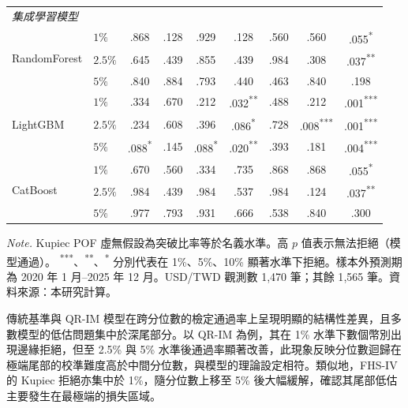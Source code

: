 \begin{table}[htbp]
{\begin{tabular}{llccccccc}
        \cline{2-9}
        \hline
        \multicolumn{9}{l}{\textit{集成學習模型}} \\
        \multirow{3}{*}{RandomForest}  & $1\%$      & .868 & .128 & .929 & .128 & .560 & .560 & .055\textsuperscript{*} \\
                                       & $2.5\%$    & .645 & .439 & .855 & .439 & .984 & .308 & .037\textsuperscript{**} \\
                                       & $5\%$      & .840 & .884 & .793 & .440 & .463 & .840 & .198 \\
        \cline{2-9}
        \multirow{3}{*}{LightGBM}      & $1\%$      & .334 & .670 & .212 & .032\textsuperscript{**} & .488 & .212 & .001\textsuperscript{***} \\
                                       & $2.5\%$    & .234 & .608 & .396 & .086\textsuperscript{*} & .728 & .008\textsuperscript{***} & .001\textsuperscript{***} \\
                                       & $5\%$      & .088\textsuperscript{*} & .145 & .088\textsuperscript{*} & .020\textsuperscript{**} & .393 & .181 & .004\textsuperscript{***} \\
        \cline{2-9}
        \multirow{3}{*}{CatBoost}      & $1\%$      & .670 & .560 & .334 & .735 & .868 & .868 & .055\textsuperscript{*} \\
                                       & $2.5\%$    & .984 & .439 & .984 & .537 & .984 & .124 & .037\textsuperscript{**} \\
                                       & $5\%$      & .977 & .793 & .931 & .666 & .538 & .840 & .300 \\
        \cline{2-9}
        \hline
    \end{tabular}}

    \vspace{3mm}
    \begin{minipage}{\textwidth}
        \fontsize{9pt}{13pt}\selectfont
        \textit{Note.} Kupiec POF 虛無假設為突破比率等於名義水準。高 $p$ 值表示無法拒絕（模型通過）。
        \textsuperscript{***}、\textsuperscript{**}、\textsuperscript{*} 分別代表在 1\%、5\%、10\%
        顯著水準下拒絕。樣本外預測期為 2020 年 1 月--2025 年 12 月。USD/TWD 觀測數 1{,}470 筆；其餘 1{,}565 筆。資料來源：本研究計算。
    \end{minipage}
\end{table}

傳統基準與 QR-IM 模型在跨分位數的檢定通過率上呈現明顯的結構性差異，且多數模型的低估問題集中於深尾部分。以 QR-IM 為例，其在 1\% 水準下數個幣別出現邊緣拒絕，但至 2.5\% 與 5\% 水準後通過率顯著改善，此現象反映分位數迴歸在極端尾部的校準難度高於中間分位數，與模型的理論設定相符。類似地，FHS-IV 的 Kupiec 拒絕亦集中於 1\%，隨分位數上移至 5\% 後大幅緩解，確認其尾部低估主要發生在最極端的損失區域。

